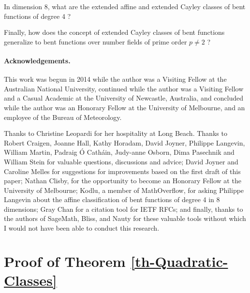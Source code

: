 In dimension 8, what are the extended affine and extended Cayley classes of bent functions of degree 4 \cite{LanL11counting}?

Finally, how does the concept of extended Cayley classes of bent functions generalize to bent functions
over number fields of prime order $p \neq 2$ \cite{CheTZ11}?



\paragraph*{Acknowledgements.}
This work was begun in 2014 while the author was a Visiting Fellow at the Australian National University,
continued while the author was a Visiting Fellow and a Casual Academic at the University of Newcastle, Australia,
and concluded while the author was an Honorary Fellow at the University of Melbourne,
and an employee of the Bureau of Meteorology.

Thanks to Christine Leopardi for her hospitality at Long Beach.
Thanks to
Robert Craigen,
Joanne Hall,
Kathy Horadam,
David Joyner,
Philippe Langevin,
William Martin,
Padraig {\'O} Cath{\'a}in,
Judy-anne Osborn,
Dima Pasechnik and
William Stein
for valuable questions, discussions and advice;
David Joyner and Caroline Melles for suggestions for improvements based on the first draft of this paper;
Nathan Clisby, for the opportunity to become an Honorary Fellow at the University of Melbourne;
Kodlu, a member of MathOverflow, for asking Philippe Langevin about the affine classification
of bent functions of degree 4 in 8 dimensions;
Gray Chan for a citation tool for IETF RFCs;
and finally, thanks to the authors of SageMath, Bliss, and Nauty for these valuable tools
without which I would not have been able to conduct this research.

\newpage

\appendix

\section{Proof of Theorem \ref{th-Quadratic-Classes}}
\label{app-proof-of}

